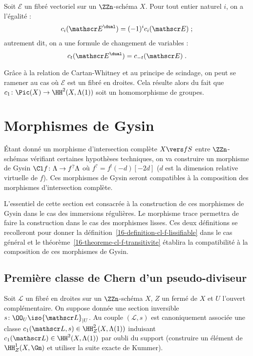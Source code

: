 \documentclass[10pt]{../fichiers-configuration-latex/smfart}
\begin{document}
\begin{proposition}
Soit $\mathscr E$ un fibré vectoriel sur un $\ZZn$-schéma $X$.
Pour tout entier
naturel $i$, on a l'égalité :
\[c_i(\mathscr E^\dual)=(-1)^i c_i(\mathscr E)\;\text{;}\]
autrement dit, on a une formule de changement de variables :
\[c_t(\mathscr E^\dual)=c_{-t}(\mathscr E)\;\text{.}\]
\end{proposition}

Grâce à la relation de Cartan-Whitney et au principe de scindage, on peut 
se ramener au cas où $\mathscr E$ est un fibré en droites. Cela résulte alors 
du fait que $c_1\colon \Pic(X)\to \HH^2(X,\Lambda(1))$ soit un homomorphisme
de groupes.

\section{Morphismes de Gysin}%
\label{16-section-gysin}


Étant donné un morphisme d'intersection complète $X\vers f S$ entre
$\ZZn$-schémas vérifiant certaines hypothèses techniques, on va construire
un morphisme de Gysin $\Cl f\colon \Lambda\to f^?\Lambda$ où
$f^?=f^!(-d)[-2d]$ ($d$ est la dimension relative virtuelle de $f$).
Ces morphismes de Gysin seront
compatibles à la composition des morphismes d'intersection complète.

L'essentiel de cette section est consacrée à la construction de ces
morphismes de Gysin dans le cas des immersions régulières. Le morphisme trace
permettra de faire la construction dans le cas des morphismes lisses.
Ces deux définitions se recolleront pour donner la
définition~\ref{16-definition-cl-f-lissifiable} dans le cas général et le
théorème~\ref{16-theoreme-cl-f-transitivite} établira la compatibilité à la
composition de ces morphismes de Gysin.

\subsection{Première classe de Chern d'un pseudo-diviseur}%

Soit $\mathscr L$ un fibré en droites sur un $\ZZn$-schéma $X$, $Z$ un
fermé de $X$ et $U$ l'ouvert complémentaire. On suppose donnée une section
inversible $s\colon \OO_U\iso {\mathscr L}_{|U}$. Au couple $(\mathscr
L,s)$ est canoniquement associée une classe $c_1(\mathscr L,s)\in
\HH^2_Z(X,\Lambda(1))$ induisant $c_1(\mathscr L)\in \HH^2(X,\Lambda(1))$ par
oubli du support (construire un élément de $\HH^1_Z(X,\Gm)$ et
utiliser la suite exacte de Kummer).
\end{document}
